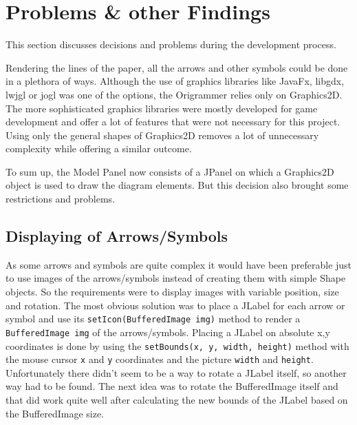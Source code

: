
\section{Problems \& other Findings}
\label{sec:problems}

This section discusses decisions and problems during the development process.

Rendering the lines of the paper, all the arrows and other symbols could be done in a plethora of ways. Although the use of graphics libraries like JavaFx, libgdx, lwjgl or jogl was one of the options, the Origrammer relies only on Graphics2D. The more sophisticated graphics libraries were mostly developed for game development and offer a lot of features that were not necessary for this project. Using only the general shapes of Graphics2D removes a lot of unnecessary complexity while offering a similar outcome.

To sum up, the Model Panel now consists of a JPanel on which a Graphics2D object is used to draw the diagram elements. But this decision also brought some restrictions and problems.


\subsection{Displaying of Arrows/Symbols}
\label{sec:displaySymbols}
As some arrows and symbols are quite complex it would have been preferable just to use images of the arrows/symbols instead of creating them with simple Shape objects. So the requirements were to display images with variable position, size and rotation. The most obvious solution was to place a JLabel for each arrow or symbol and use its \texttt{setIcon(BufferedImage img)} method to render a \texttt{BufferedImage img} of the arrows/symbols. Placing a JLabel on absolute x,y coordinates is done by using the \texttt{setBounds(x, y, width, height)} method with the mouse cursor \texttt{x} and \texttt{y} coordinates and the picture \texttt{width} and \texttt{height}. Unfortunately there didn't seem to be a way to rotate a JLabel itself, so another way had to be found. The next idea was to rotate the BufferedImage itself and that did work quite well after calculating the new bounds of the JLabel based on the BufferedImage size.

